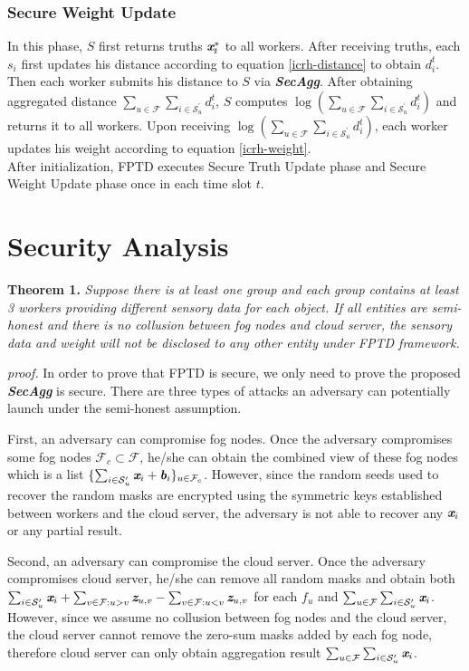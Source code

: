 \documentclass[conference,a4paper]{IEEEtran}
\def\textbi#1{\textbf{\em #1}}
\begin{document}
        \subsubsection{Secure Weight Update}
        In this phase, $S$ first returns truths $\textbi{x}_t^*$ to all workers. After receiving truths, each $s_i$ first updates his distance according to equation \ref{icrh-distance} to obtain $d_i^t$. Then each worker submits his distance to $S$ via \textbi{SecAgg}. After obtaining aggregated distance $\sum_{u\in \mathcal{F}} \sum_{i\in \mathcal{S}_u^\prime} d_i^t$, $S$ computes $\log{(\sum_{u\in \mathcal{F}} \sum_{i\in \mathcal{S}_u^\prime} d_i^t)}$ and returns it to all workers. Upon receiving $\log{(\sum_{u\in \mathcal{F}} \sum_{i\in \mathcal{S}_u^\prime} d_i^t)}$, each worker updates his weight according to equation \ref{icrh-weight}.\\

    After initialization, FPTD executes Secure Truth Update phase and Secure Weight Update phase once in each time slot $t$.
\section{Security Analysis}\label{sec_analysis}
    \textbf{Theorem 1.}  {\em Suppose there is at least one group and each group contains at least 3 workers providing different sensory data for each object. If all entities are semi-honest and there is no collusion between fog nodes and cloud server, the sensory data and weight will not be disclosed to any other entity under FPTD framework.}

    {\em proof.} In order to prove that FPTD is secure, we only need to prove the proposed \textbi{SecAgg} is secure. There are three types of attacks an adversary can potentially launch under the semi-honest assumption.

    First, an adversary can compromise fog nodes. Once the adversary compromises some fog nodes $\mathcal{F}_c\subset \mathcal{F}$, he/she can obtain the combined view of these fog nodes which is a list $\{\sum_{i\in \mathcal{S}_u^\prime}\textbi{x}_i+\textbi{b}_i\}_{u\in \mathcal{F}_c}$. However, since the random seeds used to recover the random masks are encrypted using the symmetric keys established between workers and the cloud server, the adversary is not able to recover any $\textbi{x}_i$ or any partial result.

    Second, an adversary can compromise the cloud server. Once the adversary compromises cloud server, he/she can remove all random masks and obtain both $\sum_{i\in\mathcal{S}_u^\prime}\textbi{x}_i+\sum_{v\in\mathcal{F}:u>v}\textbi{z}_{u,v}-\sum_{v\in\mathcal{F}:u<v}\textbi{z}_{u,v}$ for each $f_u$ and $\sum_{u\in\mathcal{F}}\sum_{i\in\mathcal{S}_u^\prime}\textbi{x}_i$. However, since we assume no collusion between fog nodes and the cloud server, the cloud server cannot remove the zero-sum masks added by each fog node, therefore cloud server can only obtain aggregation result $\sum_{u\in\mathcal{F}}\sum_{i\in\mathcal{S}_u^\prime}\textbi{x}_i$.
\end{document}
